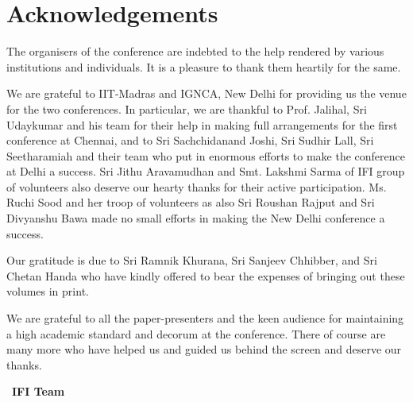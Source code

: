 \makeatletter
\def\@makeschapterhead#1{%
  \vspace*{50\p@}%
  {\parindent \z@ \raggedright
    \normalfont
    \interlinepenalty\@M
    \LARGE \bfseries  #1\par\nobreak
    \vskip 40\p@
  }}
\makeatother

\chapter*{Acknowledgements}\label{ack}



The organisers of the conference are indebted to the help rendered by various 
institutions and individuals. It is a pleasure to thank them heartily for the same.

We are grateful to IIT-Madras and IGNCA, New Delhi for providing us the venue for the two conferences.
In particular, we are thankful to Prof. Jalihal, Sri Udaykumar and his team for their help in making 
full arrangements for the first conference at Chennai, and to Sri Sachchidanand Joshi, Sri Sudhir Lall, 
Sri Seetharamiah and their team who put in enormous efforts to make the conference at Delhi a success. 
Sri Jithu Aravamudhan and Smt. Lakshmi Sarma of IFI group of volunteers also deserve our hearty thanks 
for their active participation. Ms. Ruchi Sood and her troop of volunteers as also Sri Roushan Rajput 
and Sri Divyanshu Bawa made no small efforts in making the New Delhi conference a success.

Our gratitude is due to Sri Ramnik Khurana, Sri Sanjeev Chhibber, and 
Sri Chetan Handa who have kindly offered to bear the expenses of bringing out these volumes in print.

We are grateful to all the paper-presenters and the keen audience for maintaining a high academic standard 
and decorum at the conference. There of course are many more who have helped us and guided us behind the 
screen and deserve our thanks.
\bigskip

~\hfill {\bf IFI Team}
